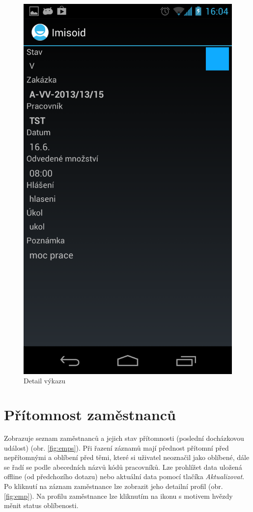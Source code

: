 \documentclass{diplomka}
\begin{document}
\begin{figure}[H]
  \centering
  \includegraphics[scale=0.25]{scr/record.png}
  \caption{Detail výkazu}
  \label{fig:record}
\end{figure}

\section{Přítomnost zaměstnanců}
\label{sec:emps}
Zobrazuje seznam zaměstnanců a jejich stav přítomnosti (poslední docházkovou událost) (obr. \ref{fig:emps}). Při řazení záznamů mají přednost přítomní před nepřítomnými a oblíbení před těmi, které si uživatel neoznačil jako oblíbené, dále se řadí se podle abecedních názvů kódů pracovníků. Lze prohlížet data uložená offline (od předchozího dotazu) nebo aktuální data pomocí tlačíka \emph{Aktualizovat}. Po kliknutí na záznam zaměstnance lze zobrazit jeho detailní profil (obr. \ref{fig:emp}). Na profilu zaměstnance lze kliknutím na ikonu s motivem hvězdy měnit status oblíbenosti.
\end{document}
